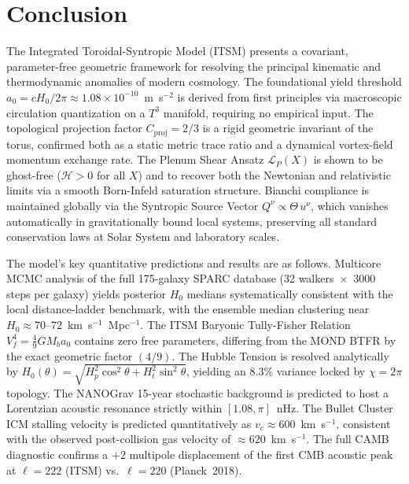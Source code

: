 \documentclass[aps,prd,10pt,twocolumn,superscriptaddress,nofootinbib]{revtex4-2}
\begin{document}
\section{Conclusion}

The Integrated Toroidal-Syntropic Model (ITSM) presents a covariant, parameter-free geometric framework for resolving the principal kinematic and thermodynamic anomalies of modern cosmology. The foundational yield threshold $a_0 = cH_0/2\pi \approx 1.08 \times 10^{-10}$~m~s$^{-2}$ is derived from first principles via macroscopic circulation quantization on a $T^3$ manifold, requiring no empirical input. The topological projection factor $C_{\text{proj}} = 2/3$ is a rigid geometric invariant of the torus, confirmed both as a static metric trace ratio and a dynamical vortex-field momentum exchange rate. The Plenum Shear Ansatz $\mathcal{L}_P(X)$ is shown to be ghost-free ($\mathcal{H} > 0$ for all $X$) and to recover both the Newtonian and relativistic limits via a smooth Born-Infeld saturation structure. Bianchi compliance is maintained globally via the Syntropic Source Vector $Q^\nu \propto \Theta\,u^\nu$, which vanishes automatically in gravitationally bound local systems, preserving all standard conservation laws at Solar System and laboratory scales.

The model's key quantitative predictions and results are as follows. Multicore MCMC analysis of the full 175-galaxy SPARC database (32 walkers~$\times$~3000 steps per galaxy) yields posterior $H_0$ medians systematically consistent with the local distance-ladder benchmark, with the ensemble median clustering near $H_0 \approx 70$--$72$~km~s$^{-1}$~Mpc$^{-1}$. The ITSM Baryonic Tully-Fisher Relation $V_f^4 = \frac{4}{9}G M_b a_0$ contains zero free parameters, differing from the MOND BTFR by the exact geometric factor $(4/9)$. The Hubble Tension is resolved analytically by $H_0(\theta) = \sqrt{H_p^2\cos^2\theta + H_t^2\sin^2\theta}$, yielding an $8.3\%$ variance locked by $\chi = 2\pi$ topology. The NANOGrav 15-year stochastic background is predicted to host a Lorentzian acoustic resonance strictly within $[1.08, \pi]$~nHz. The Bullet Cluster ICM stalling velocity is predicted quantitatively as $v_c \approx 600$~km~s$^{-1}$, consistent with the observed post-collision gas velocity of $\approx 620$~km~s$^{-1}$. The full CAMB diagnostic confirms a $+2$ multipole displacement of the first CMB acoustic peak at $\ell = 222$ (ITSM) vs.~$\ell = 220$ (Planck~2018).
\end{document}
